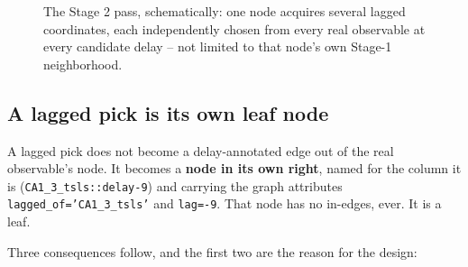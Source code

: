 \documentclass[11pt]{article}
\begin{document}
\begin{figure}[h]
\centering
{}
\caption{The Stage 2 pass, schematically: one node acquires several lagged coordinates, each independently chosen from every real observable at every candidate delay -- not limited to that node's own Stage-1 neighborhood.}
\label{fig:stage2-schematic}
\end{figure}

\subsection{A lagged pick is its own leaf node}
\label{sec:stage2-leaves}
A lagged pick does not become a delay-annotated edge out of the real observable's node. It becomes a \textbf{node in its own right}, named for the column it is (\texttt{CA1\_3\_tsls::delay-9}) and carrying the graph attributes \texttt{lagged\_of='CA1\_3\_tsls'} and \texttt{lag=-9}. That node has no in-edges, ever. It is a leaf.

Three consequences follow, and the first two are the reason for the design:
\end{document}
